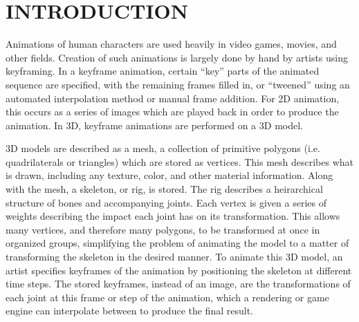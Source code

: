 
 
\chapter{INTRODUCTION}
\label{chapter:intro}


Animations of human characters are used heavily in video games, movies, and other fields.  Creation of such animations is largely done by hand by artists using keyframing.  In a keyframe animation, certain ``key'' parts of the animated sequence are specified, with the remaining frames filled in, or ``tweened'' using an automated interpolation method or manual frame addition.  For 2D animation, this occurs as a series of images which are played back in order to produce the animation.  In 3D, keyframe animations are performed on a 3D model.


3D models are described as a mesh, a collection of primitive polygons (i.e. quadrilaterals or triangles) which are stored as vertices.  This mesh describes what is drawn, including any texture, color, and other material information.  Along with the mesh, a skeleton, or rig, is stored.  The rig describes a heirarchical structure of bones and accompanying joints.  Each vertex is given a series of weights describing the impact each joint has on its transformation.  This allows many vertices, and therefore many polygons, to be transformed at once in organized groups, simplifying the problem of animating the model to a matter of transforming the skeleton in the desired manner.  To animate this 3D model, an artist specifies keyframes of the animation by positioning the skeleton at different time steps.  The stored keyframes, instead of an image, are the transformations of each joint at this frame or step of the animation, which a rendering or game engine can interpolate between to produce the final result.

